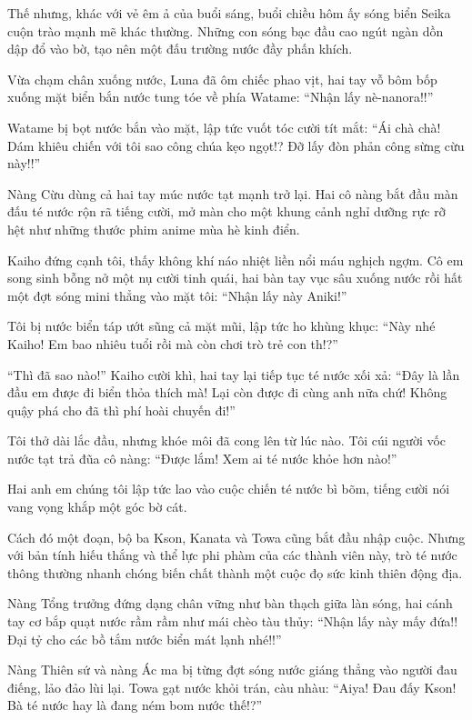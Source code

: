 \documentclass[../main.tex]{subfiles}
\begin{document}
Thế nhưng, khác với vẻ êm ả của buổi sáng, buổi chiều hôm ấy sóng biển Seika cuộn trào mạnh mẽ khác thường. Những con sóng bạc đầu cao ngút ngàn dồn dập đổ vào bờ, tạo nên một đấu trường nước đầy phấn khích.

Vừa chạm chân xuống nước, Luna đã ôm chiếc phao vịt, hai tay vỗ bôm bốp xuống mặt biển bắn nước tung tóe về phía Watame: ``Nhận lấy nè-nanora!!''

Watame bị bọt nước bắn vào mặt, lập tức vuốt tóc cười tít mắt: ``Ái chà chà! Dám khiêu chiến với tôi sao công chúa kẹo ngọt!? Đỡ lấy đòn phản công sừng cừu này!!''

Nàng Cừu dùng cả hai tay múc nước tạt mạnh trở lại. Hai cô nàng bắt đầu màn đấu té nước rộn rã tiếng cười, mở màn cho một khung cảnh nghỉ dưỡng rực rỡ hệt như những thước phim anime mùa hè kinh điển.

Kaiho đứng cạnh tôi, thấy không khí náo nhiệt liền nổi máu nghịch ngợm. Cô em song sinh bỗng nở một nụ cười tinh quái, hai bàn tay vục sâu xuống nước rồi hất một đợt sóng mini thẳng vào mặt tôi: ``Nhận lấy này Aniki!''

Tôi bị nước biển táp ướt sũng cả mặt mũi, lập tức ho khùng khục: ``Này nhé Kaiho! Em bao nhiêu tuổi rồi mà còn chơi trò trẻ con th!?''

``Thì đã sao nào!'' Kaiho cười khì, hai tay lại tiếp tục té nước xối xả: ``Đây là lần đầu em được đi biển thỏa thích mà! Lại còn được đi cùng anh nữa chứ! Không quậy phá cho đã thì phí hoài chuyến đi!''

Tôi thở dài lắc đầu, nhưng khóe môi đã cong lên từ lúc nào. Tôi cúi người vốc nước tạt trả đũa cô nàng: ``Được lắm! Xem ai té nước khỏe hơn nào!''

Hai anh em chúng tôi lập tức lao vào cuộc chiến té nước bì bõm, tiếng cười nói vang vọng khắp một góc bờ cát.

Cách đó một đoạn, bộ ba Kson, Kanata và Towa cũng bắt đầu nhập cuộc. Nhưng với bản tính hiếu thắng và thể lực phi phàm của các thành viên này, trò té nước thông thường nhanh chóng biến chất thành một cuộc đọ sức kinh thiên động địa.

Nàng Tổng trưởng đứng dạng chân vững như bàn thạch giữa làn sóng, hai cánh tay cơ bắp quạt nước rầm rầm như mái chèo tàu thủy: ``Nhận lấy này mấy đứa!! Đại tỷ cho các bồ tắm nước biển mát lạnh nhé!!''

Nàng Thiên sứ và nàng Ác ma bị từng đợt sóng nước giáng thẳng vào người đau điếng, lảo đảo lùi lại. Towa gạt nước khỏi trán, càu nhàu: ``Aiya! Đau đấy Kson! Bà té nước hay là đang ném bom nước thế!?''
\end{document}
